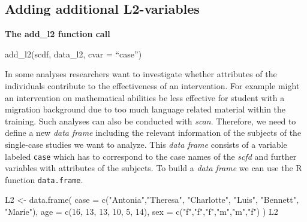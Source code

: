 \documentclass[
  letterpaper,
  DIV=11,
  numbers=noendperiod]{scrreprt}
\newenvironment{Shaded}{\begin{snugshade}}{\end{snugshade}}
\newcommand{\AttributeTok}[1]{\textcolor[rgb]{0.40,0.45,0.13}{#1}}
\newcommand{\DecValTok}[1]{\textcolor[rgb]{0.68,0.00,0.00}{#1}}
\newcommand{\FunctionTok}[1]{\textcolor[rgb]{0.28,0.35,0.67}{#1}}
\newcommand{\NormalTok}[1]{\textcolor[rgb]{0.00,0.23,0.31}{#1}}
\newcommand{\OtherTok}[1]{\textcolor[rgb]{0.00,0.23,0.31}{#1}}
\newcommand{\StringTok}[1]{\textcolor[rgb]{0.13,0.47,0.30}{#1}}
\begin{document}
\hypertarget{sec-add-l2}{%
\subsection{Adding additional L2-variables}\label{sec-add-l2}}

\begin{tcolorbox}[enhanced jigsaw, breakable, rightrule=.15mm, bottomrule=.15mm, arc=.35mm, colback=white, colframe=quarto-callout-tip-color-frame, opacityback=0, leftrule=.75mm, toprule=.15mm, left=2mm]
\begin{minipage}[t]{5.5mm}
\textcolor{quarto-callout-tip-color}{\faLightbulb}
\end{minipage}%
\begin{minipage}[t]{\textwidth - 5.5mm}

\textbf{The add\_l2 function call}\vspace{2mm}

add\_l2(scdf, data\_l2, cvar = ``case'')

\end{minipage}%
\end{tcolorbox}

In some analyses researchers want to investigate whether attributes of
the individuals contribute to the effectiveness of an intervention. For
example might an intervention on mathematical abilities be less
effective for student with a migration background due to too much
language related material within the training. Such analyses can also be
conducted with \emph{scan}. Therefore, we need to define a new
\emph{data frame} including the relevant information of the subjects of
the single-case studies we want to analyze. This \emph{data frame}
consists of a variable labeled \texttt{case} which has to correspond to
the case names of the \emph{scfd} and further variables with attributes
of the subjects. To build a \emph{data frame} we can use the R function
\texttt{data.frame}.

\begin{Shaded}
\begin{Highlighting}[]
\NormalTok{L2 }\OtherTok{\textless{}{-}} \FunctionTok{data.frame}\NormalTok{(}
  \AttributeTok{case =} \FunctionTok{c}\NormalTok{(}\StringTok{"Antonia"}\NormalTok{,}\StringTok{"Theresa"}\NormalTok{, }\StringTok{"Charlotte"}\NormalTok{, }\StringTok{"Luis"}\NormalTok{, }\StringTok{"Bennett"}\NormalTok{, }\StringTok{"Marie"}\NormalTok{), }
  \AttributeTok{age =} \FunctionTok{c}\NormalTok{(}\DecValTok{16}\NormalTok{, }\DecValTok{13}\NormalTok{, }\DecValTok{13}\NormalTok{, }\DecValTok{10}\NormalTok{, }\DecValTok{5}\NormalTok{, }\DecValTok{14}\NormalTok{), }
  \AttributeTok{sex =} \FunctionTok{c}\NormalTok{(}\StringTok{"f"}\NormalTok{,}\StringTok{"f"}\NormalTok{,}\StringTok{"f"}\NormalTok{,}\StringTok{"m"}\NormalTok{,}\StringTok{"m"}\NormalTok{,}\StringTok{"f"}\NormalTok{)}
\NormalTok{)}
\NormalTok{L2}
\end{Highlighting}
\end{Shaded}
\end{document}
